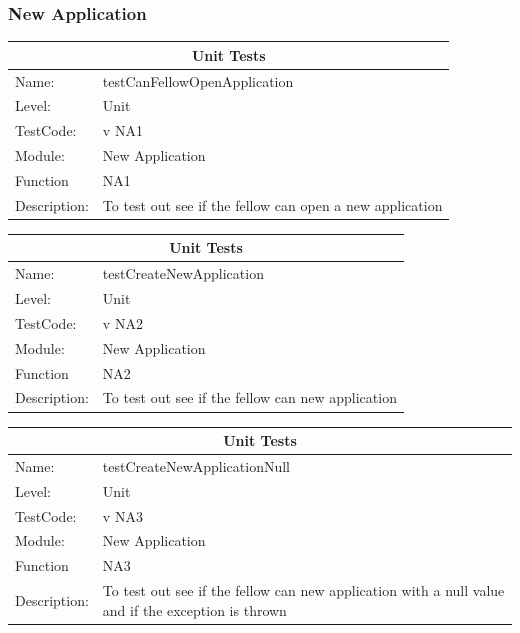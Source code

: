 \documentclass[12pt]{article}
\begin{document}
\subsubsection{New Application}
\begin{center}
\begin{tabular}{|l|p{12cm}|}
\hline
\multicolumn{2}{|c|}{\bf Unit Tests} \\
\hline
 Name: & testCanFellowOpenApplication  \\
\hline
Level: & Unit \\
\hline
TestCode: & v NA1 \\
\hline
Module:& New Application\\
\hline
Function & NA1 \\
\hline
Description: & To test out see if the fellow can open a new application  \\
\hline

\end{tabular}
\end{center}

\begin{center}
\begin{tabular}{|l|p{12cm}|}
\hline
\multicolumn{2}{|c|}{\bf Unit Tests} \\
\hline
 Name: & testCreateNewApplication  \\
\hline
Level: & Unit \\
\hline
TestCode: & v NA2 \\
\hline
Module:& New Application\\
\hline
Function & NA2 \\
\hline
Description: & To test out see if the fellow can  new application  \\
\hline

\end{tabular}
\end{center}

\begin{center}
\begin{tabular}{|l|p{12cm}|}
\hline
\multicolumn{2}{|c|}{\bf Unit Tests} \\
\hline
 Name: & testCreateNewApplicationNull  \\
\hline
Level: & Unit \\
\hline
TestCode: & v NA3 \\
\hline
Module:& New Application\\
\hline
Function & NA3 \\
\hline
Description: & To test out see if the fellow can  new application with a null value and if the exception is thrown  \\
\hline

\end{tabular}
\end{center}
\end{document}
